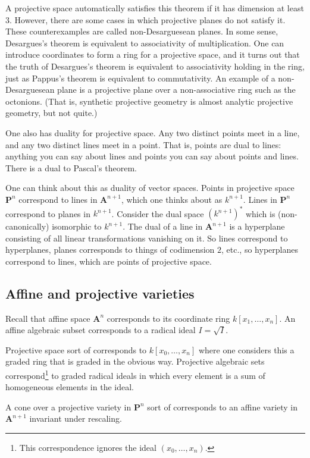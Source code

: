 \documentclass [11 pt, oneside, margin = 1 in] {article}
\begin{document}
A projective space automatically satisfies this theorem if it has dimension at least $3$. However, there are some cases in which projective planes do not satisfy it. These counterexamples are called non-Desarguesean planes. In some sense, Desargues's theorem is equivalent to associativity of multiplication. One can introduce coordinates to form a ring for a projective space, and it turns out that the truth of Desargues's theorem is equivalent to associativity holding in the ring, just as Pappus's theorem is equivalent to commutativity. An example of a non-Desarguesean plane is a projective plane over a non-associative ring such as the octonions. (That is, synthetic projective geometry is almost analytic projective geometry, but not quite.)

One also has duality for projective space. Any two distinct points meet in a line, and any two distinct lines meet in a point. That is, points are dual to lines: anything you can say about lines and points you can say about points and lines. There is a dual to Pascal's theorem. 

One can think about this as duality of vector spaces. Points in projective space $\mathbf{P}^n$ correspond to lines in $\mathbf{A}^{n+1}$, which one thinks about as $k^{n+1}$. Lines in $\mathbf{P}^n$ correspond to planes in $k^{n+1}$. Consider the dual space $(k^{n+1})^*$ which is (non-canonically) isomorphic to $k^{n+1}$. The dual of a line in $\mathbf{A}^{n+1}$ is a hyperplane consisting of all linear transformations vanishing on it. So lines correspond to hyperplanes, planes corresponds to things of codimension $2$, etc., so hyperplanes correspond to lines, which are points of projective space.

\subsection{Affine and projective varieties}
Recall that affine space $\mathbf{A}^n$ corresponds to its coordinate ring $k[x_1,\hdots, x_n]$. An affine algebraic subset corresponds to a radical ideal $I=\sqrt{I} $.

Projective space sort of corresponds to $k[x_0,\hdots, x_n]$ where one considers this a graded ring that is graded in the obvious way. Projective algebraic sets correspond\footnote{This correspondence ignores the ideal $(x_0,\hdots, x_n)$.} to graded radical ideals in which every element is a sum of homogeneous elements in the ideal.

A cone over a projective variety in $\mathbf{P}^n$ sort of corresponds to an affine variety in $\mathbf{A}^{n+1}$ invariant under rescaling.
\end{document}
